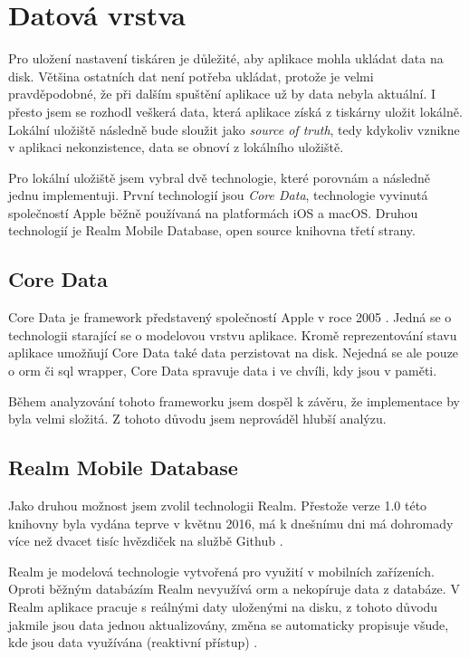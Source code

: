\section{Datová vrstva}\label{analyza-datova-vrstva}

Pro uložení nastavení tiskáren je důležité, aby aplikace mohla ukládat data na disk.
Většina ostatních dat není potřeba ukládat, protože je velmi pravděpodobné, že při dalším spuštění aplikace už by data nebyla aktuální.
I přesto jsem se rozhodl veškerá data, která aplikace získá z tiskárny uložit lokálně.
Lokální uložiště následně bude sloužit jako \textit{source of truth}, tedy kdykoliv vznikne v aplikaci nekonzistence, data se obnoví z lokálního uložiště.

Pro lokální uložiště jsem vybral dvě technologie, které porovnám a následně jednu implementuji.
První technologií jsou \textit{Core Data}, technologie vyvinutá společností Apple běžně používaná na platformách iOS a macOS.
Druhou technologií je Realm Mobile Database, open source knihovna třetí strany.

\subsection{Core Data}

Core Data je framework představený společností Apple v roce 2005 \cite{objcio-core-data}.
Jedná se o technologii starající se o modelovou vrstvu aplikace.
Kromě reprezentování stavu aplikace umožňují Core Data také data perzistovat na disk.
Nejedná se ale pouze o \acrshort{orm} či \acrshort{sql} wrapper, Core Data spravuje data i ve chvíli, kdy jsou v paměti.

Během analyzování tohoto frameworku jsem dospěl k závěru, že implementace by byla velmi složitá.
Z tohoto důvodu jsem neprováděl hlubší analýzu.

\subsection{Realm Mobile Database}\label{datova-vrstva-realm}

Jako druhou možnost jsem zvolil technologii Realm.
Přestože verze 1.0 této knihovny byla vydána teprve v květnu 2016, má k dnešnímu dni má dohromady více než dvacet tisíc hvězdiček na službě Github \cite{github-realm-repos}.

Realm je modelová technologie vytvořená pro využití v mobilních zařízeních.
Oproti běžným databázím Realm nevyužívá \acrshort{orm} a nekopíruje data z databáze.
V Realm aplikace pracuje s reálnými daty uloženými na disku, z tohoto důvodu jakmile jsou data jednou aktualizovány, změna se automaticky propisuje všude, kde jsou data využívána (reaktivní přístup) \cite{realm-overview}.

